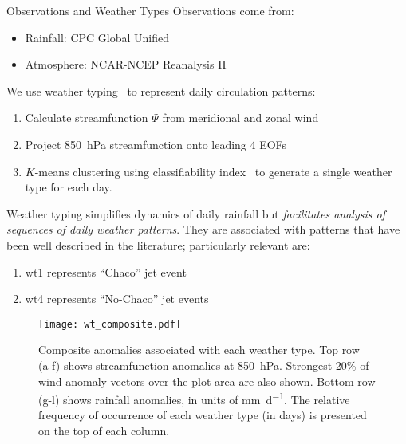 \begin{block}{Observations and Weather Types}
    Observations come from:
    \begin{itemize}
        \item Rainfall:  CPC Global Unified~\cite{Xie:1996ga}
        \item Atmosphere:  NCAR-NCEP Reanalysis II~\cite{Kanamitsu:2002ig}
    \end{itemize}
    We use weather typing~\cite{Munoz:2015dc} to represent daily circulation patterns:
    \begin{enumerate}
        \item Calculate streamfunction $\Psi$ from meridional and zonal wind~\cite{Dawson:2016cu}
        \item Project \SI{850}{\hecto\pascal} streamfunction onto leading 4 EOFs
        \item $K$-means clustering using classifiability index~\cite{Michelangeli:1995es} to generate a single weather type for each day.\\
    \end{enumerate}
    Weather typing simplifies dynamics of daily rainfall but \emph{facilitates analysis of sequences of daily weather patterns}.
    They are associated with patterns that have been well described in the literature; particularly relevant are:
    \begin{enumerate}
        \item \gls{wt}1 represents ``Chaco'' jet event~\cite{Salio:2002ev}
        \item \gls{wt}4 represents ``No-Chaco'' jet events~\cite{Vera:2006ib}
    \end{enumerate}
    \begin{framed}
        \begin{figure}
            \centering
            \noindent\texttt{[image: wt\_composite.pdf]}
            \caption{
                Composite anomalies associated with each weather type.
                Top row (a-f) shows streamfunction anomalies at \SIlist{850}{\hecto\pascal}.
                Strongest 20\% of wind anomaly vectors over the plot area are also shown.
                Bottom row (g-l) shows rainfall anomalies, in units of \si{\milli\meter\per\day}.
                The relative frequency of occurrence of each weather type (in days) is presented on the top of each column.
            }
            \label{fig:weather-type-composite}
        \end{figure}
    \end{framed}
\end{block}
